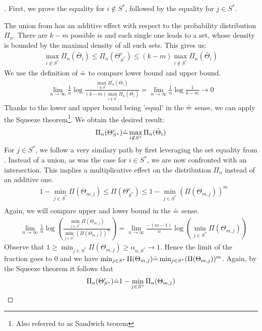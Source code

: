 \begin{proof}[]
  First, we prove the equality for $i \notin S^*$, followed by the equality for $j \in S^*$.

  The union from  has an additive effect with
  respect to the probability distribution $\Pi_n$. There are $k-m$ possible $i$s
  and each single one leads to a set, whose density is bounded by the maximal
  density of all such sets. This gives us:
  \begin{align}
    \max_{i \notin S^*} \Pi_n(\bar{\Theta}_i) \leq \Pi_n(\Theta_{S^*}^c) \leq (k-m) \max_{i \notin S^*} \Pi_n(\bar{\Theta}_i)
  \end{align}
  We use the definition of $\dot{=}$ to compare lower bound and upper bound.
  \begin{align}
    \lim_{n \rightarrow \infty} \frac{1}{n} \log{\frac{\max_{i \notin S^*} \Pi_n(\bar{\Theta}_i)}{(k-m)\max_{i \notin S^*} \Pi_n(\bar{\Theta}_i)}}
    = \lim_{n \rightarrow \infty} \frac{1}{n} \log{\frac{1}{k-m}} \rightarrow 0
  \end{align}
  Thanks to the lower and upper bound being 'equal' in the $\dot{=}$ sense, we can
  apply the Squeeze theorem\footnote{Also referred to as Sandwich teorem}. We
  obtain the desired result:
  \begin{align}
    \Pi_n(\Theta_{S^*}^c) \dot{=} \max_{i \notin S^*} \Pi_n(\bar{\Theta}_i)
  \end{align}
  For $j \in S^*$, we follow a very similary path by first leveraging the set
  equality from . Instead of a union, as was the
  case for $i \in S^*$, we are now confronted with an intersection. This implies
  a multiplicative effect on the distribution $\Pi_n$ instead of an additive
  one.
  \begin{align}
    &1 - \min_{j \in S^*} \Pi(\Theta_{m, j}) \leq \Pi(\Theta_{S^*}^c) \leq 1 - \min_{j \in S^*} (\Pi(\Theta_{m, j}))^m \\
  \end{align}
  Again, we will compare upper and lower bound in the $\dot{=}$ sense.
  \begin{align}
    &\lim_{n \rightarrow \infty} \frac{1}{n} \log(\frac{\min_{j \in S^*} \Pi(\Theta_{m, j})}{\min_{j \in S^*} (\Pi(\Theta_{m, j}))^m}) = \lim_{n \rightarrow \infty} \frac{-(m - 1)}{n} \log(\min_{j \in S^*} \Pi(\Theta_{m, j}))
  \end{align}
  Observe that $1 \geq \min_{j \in S^*} \Pi(\Theta_{m, j}) \geq \alpha_{n, S^*} \rightarrow 1$. Hence the limit of the fraction goes to 0 and we have $\min_{j \in S^*} \Pi(\Theta_{m, j}) \dot{=} \min_{j \in S^*} (\Pi(\Theta_{m, j}))^m$. Again, by the Squeeze theorem it follows that
  \begin{align}
    \Pi_n(\Theta_{S^*}^c) \dot{=} 1 - \min_{j \in S^*} \Pi_n(\Theta_{m, j})
  \end{align}
\end{proof}

